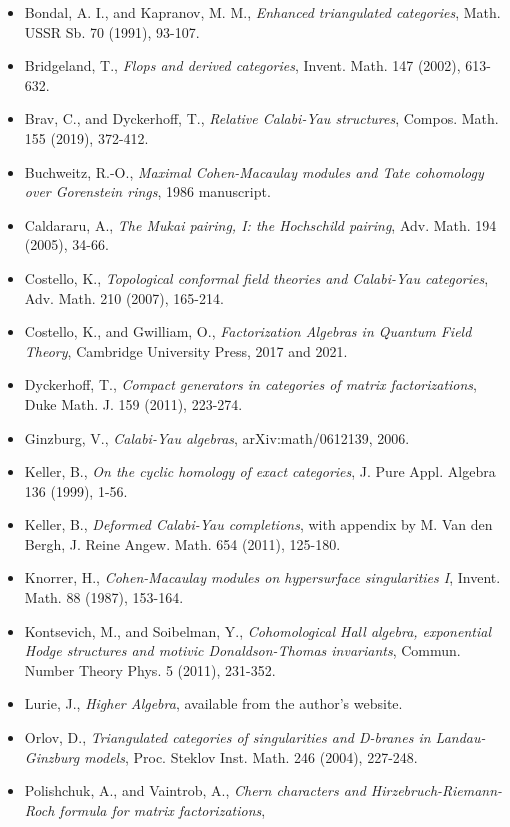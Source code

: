 \documentclass[11pt]{amsart}
\begin{document}
\begin{itemize}
\item Bondal, A. I., and Kapranov, M. M., \emph{Enhanced triangulated
categories}, Math. USSR Sb. 70 (1991), 93-107.
\item Bridgeland, T., \emph{Flops and derived categories},
Invent. Math. 147 (2002), 613-632.
\item Brav, C., and Dyckerhoff, T., \emph{Relative Calabi-Yau structures},
Compos. Math. 155 (2019), 372-412.
\item Buchweitz, R.-O., \emph{Maximal Cohen-Macaulay modules and Tate
cohomology over Gorenstein rings}, 1986 manuscript.
\item Caldararu, A., \emph{The Mukai pairing, I: the Hochschild pairing},
Adv. Math. 194 (2005), 34-66.
\item Costello, K., \emph{Topological conformal field theories and
Calabi-Yau categories}, Adv. Math. 210 (2007), 165-214.
\item Costello, K., and Gwilliam, O., \emph{Factorization Algebras in
Quantum Field Theory}, Cambridge University Press, 2017 and 2021.
\item Dyckerhoff, T., \emph{Compact generators in categories of matrix
factorizations}, Duke Math. J. 159 (2011), 223-274.
\item Ginzburg, V., \emph{Calabi-Yau algebras}, arXiv:math/0612139, 2006.
\item Keller, B., \emph{On the cyclic homology of exact categories},
J. Pure Appl. Algebra 136 (1999), 1-56.
\item Keller, B., \emph{Deformed Calabi-Yau completions}, with appendix
by M. Van den Bergh, J. Reine Angew. Math. 654 (2011), 125-180.
\item Knorrer, H., \emph{Cohen-Macaulay modules on hypersurface
singularities I}, Invent. Math. 88 (1987), 153-164.
\item Kontsevich, M., and Soibelman, Y., \emph{Cohomological Hall
algebra, exponential Hodge structures and motivic Donaldson-Thomas
invariants}, Commun. Number Theory Phys. 5 (2011), 231-352.
\item Lurie, J., \emph{Higher Algebra}, available from the author's
website.
\item Orlov, D., \emph{Triangulated categories of singularities and
D-branes in Landau-Ginzburg models}, Proc. Steklov Inst. Math. 246
(2004), 227-248.
\item Polishchuk, A., and Vaintrob, A., \emph{Chern characters and
Hirzebruch-Riemann-Roch formula for matrix factorizations},

\end{itemize}
\end{document}
